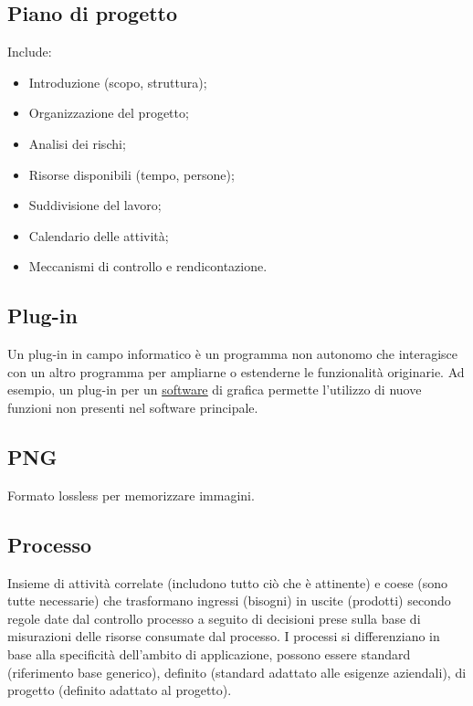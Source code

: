 
	\subsection{Piano di progetto}
	\label{sec:pianoprogetto}
	Include:
	\begin{itemize}
	\item Introduzione (scopo, struttura);
	\item Organizzazione del progetto;
	\item Analisi dei rischi;
	\item Risorse disponibili (tempo, persone);
	\item Suddivisione del lavoro;
	\item Calendario delle attività;
	\item Meccanismi di controllo e rendicontazione.
	\end{itemize}

	\subsection{Plug-in}
	\label{sec:plug-in}
	Un plug-in in campo informatico è un programma non autonomo che interagisce con un altro programma per ampliarne o estenderne le funzionalità originarie. Ad esempio, un plug-in per un \underline{\hyperref[sec:prodottosoftware]{software}} di grafica permette l'utilizzo di nuove funzioni non presenti nel software principale.

	\subsection{PNG}
	\label{sec:png}	
	Formato lossless per memorizzare immagini.

	\subsection{Processo}
	\label{sec:processi}
	Insieme di attività correlate (includono tutto ciò che è attinente) e coese (sono tutte necessarie) che trasformano ingressi (bisogni) in uscite (prodotti) secondo regole date dal controllo processo a seguito di decisioni prese sulla base di misurazioni delle risorse consumate dal processo.
	I processi si differenziano in base alla specificità dell'ambito di applicazione, possono essere standard (riferimento base generico), definito (standard adattato alle esigenze aziendali), di progetto (definito adattato al progetto).


